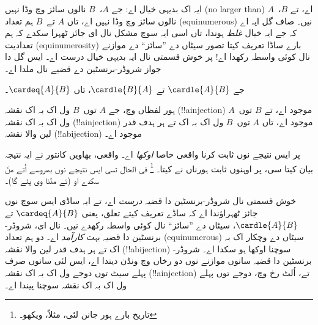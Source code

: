 \documentclass[../../../include/open-logic-section]{subfiles}
\begin{document}


\begin{explain}
ایہ اک بدیہی خیال اے: جے $A$،~$B$ نالوں سائز وچ وڈا نہیں
(no larger than) اے، تے $B$،~$A$ نالوں سائز وچ وڈا نہیں اے، تاں
$A$ تے~$B$ ہم تعداد (equinumerous) نیں۔ صاف گل ایہ اے کہ جے
ایہ خیال \emph{غلط} ہوندا، تاں اسی ایہ سوچ مشکل نال ای جائز ٹھہرا
سکدے کہ ہم تعدادیت (equinumerosity) بارے ساڈا تعریف کیتا تصور سیٹاں
دے ”سائز“ دے موازنے نال کوئی واسطہ رکھدا اے!{} پر خوش قسمتی نال ایہ
بدیہی خیال درست اے۔ ایس گل دا جواز شروڈر-برنسٹین دے قضیے نال ملدا اے۔
\end{explain}

\begin{thm}
	جے $\cardle{A}{B}$ تے $\cardle{B}{A}$،
	تاں $\cardeq{A}{B}$۔
\end{thm}

\begin{explain}
ہور لفظاں وچ، جے $A$ توں~$B$ ول اک بہ اک نقشہ
(!!a{injection}) موجود اے، تے $B$ توں~$A$ ول اک بہ اک نقشہ
(!!a{injection}) موجود اے، تاں $A$ توں~$B$ ول اک بہ اک تے ہر
ہدف قدر لین والا نقشہ (!!a{bijection}) موجود اے۔

پر ایس نتیجے نوں ثابت کرنا واقعی خاصا \emph{اوکھا} اے۔ واقعی، بھاویں
کانتور نے ایہ نتیجہ بیان کیتا سی، پر اوہنوں ثابت ہورناں نے کیتا۔
\footnote{تاریخ بارے ہور جانن لئی، مثلاً،
\citet[pp.~165--6]{Potter2004} ویکھو۔}
%
فی الحال تسی ایس نتیجے نوں بھروسے اُتے منّ سکدے او (تے منّنا وی پئے
گا)۔

خوش قسمتی نال شروڈر-برنسٹین دا قضیہ \emph{درست} اے، تے ایہ ساڈی ایس
سوچ نوں جائز ٹھہراؤندا اے کہ ساڈے تعریف کیتے تعلق، یعنی
$\cardeq{A}{B}$ تے $\cardle{A}{B}$، سیٹاں دے ”سائز“ نال کوئی واسطہ
رکھدے نیں۔ نال ای، شروڈر-برنسٹین دا قضیہ بہت \emph{کارآمد} اے۔ دو
ہم تعداد (equinumerous) سیٹاں دے وچکار اک بہ اک تے ہر ہدف قدر لین
والا نقشہ (!!a{bijection}) سوچنا اوکھا ہو سکدا اے۔ شروڈر-برنسٹین دا
قضیہ سانوں موازنے نوں دو رخاں وچ ونڈن دیندا اے، ایس لئی سانوں صرف
پہلے سیٹ توں دوجے ول اک بہ اک نقشہ (!!a{injection}) تے، اُلٹ رخ وچ،
دوجے توں پہلے ول اک بہ اک نقشہ سوچنا پیندا اے۔
\end{explain}
\end{document}
